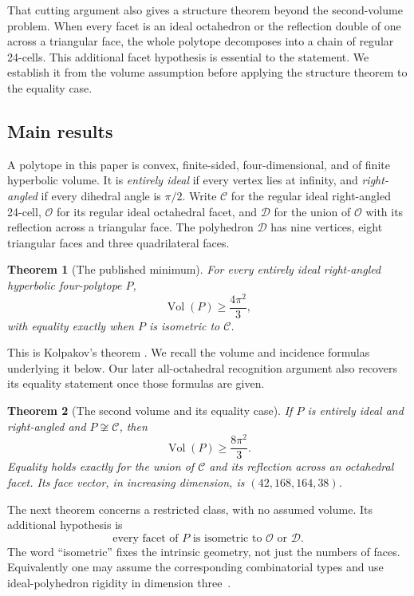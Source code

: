 \documentclass[11pt]{article}
\newtheorem{theorem}{Theorem}[section]
\theoremstyle{remark}
\newcommand{\Vol}{\operatorname{Vol}}
\newcommand{\OCT}{\mathcal O}
\newcommand{\DBL}{\mathcal D}
\newcommand{\CELL}{\mathcal C}
\begin{document}
That cutting argument also gives a structure theorem beyond the
second-volume problem. When every facet is an ideal octahedron or
the reflection double of one across a triangular face, the whole
polytope decomposes into a chain of regular 24-cells. This additional
facet hypothesis is essential to the statement. We establish it from
the volume assumption before applying the structure theorem to the
equality case.

\subsection{Main results}

A polytope in this paper is convex, finite-sided, four-dimensional,
and of finite hyperbolic volume. It is \emph{entirely ideal} if every
vertex lies at infinity, and \emph{right-angled} if every dihedral
angle is $\pi/2$. Write $\CELL$ for the regular ideal right-angled
24-cell, $\OCT$ for its regular ideal octahedral facet, and $\DBL$
for the union of $\OCT$ with its reflection across a triangular
face. The polyhedron $\DBL$ has nine vertices, eight triangular
faces and three quadrilateral faces.

\begin{theorem}[The published minimum]\label{thm:minimum}
For every entirely ideal right-angled hyperbolic four-polytope $P$,
\[
 \Vol(P)\ge\frac{4\pi^2}{3},
\]
with equality exactly when $P$ is isometric to $\CELL$.
\end{theorem}
This is Kolpakov's theorem \cite[Theorem~3]{Kolpakov}. We recall the
volume and incidence formulas underlying it below. Our later
all-octahedral recognition argument also recovers its equality
statement once those formulas are given.

\begin{theorem}[The second volume and its equality case]\label{thm:gap}
If $P$ is entirely ideal and right-angled and $P\not\cong\CELL$, then
\[
 \Vol(P)\ge\frac{8\pi^2}{3}.
\]
Equality holds exactly for the union of $\CELL$ and its reflection
across an octahedral facet. Its face vector, in increasing dimension,
is $(42,168,164,38)$.
\end{theorem}

The next theorem concerns a restricted class, with no assumed volume.
Its additional hypothesis is
\begin{equation}\label{eq:spectrum}
 \text{every facet of $P$ is isometric to $\OCT$ or $\DBL$.}
\end{equation}
The word ``isometric'' fixes the intrinsic geometry, not just the
numbers of faces. Equivalently one may assume the corresponding
combinatorial types and use ideal-polyhedron rigidity in dimension
three~\cite{Rivin}.
\end{document}
